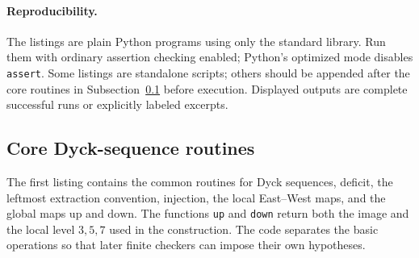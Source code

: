 \documentclass[11pt]{article}
\theoremstyle{plain}
\theoremstyle{definition}
\theoremstyle{remark}
\begin{document}
\paragraph{Reproducibility.}
The listings are plain Python programs using only the standard library.  Run
them with ordinary assertion checking enabled; Python's optimized mode disables
\lstinline{assert}.  Some listings are standalone scripts; others should be
appended after the core routines in
Subsection~\ref{subsec:core-code} before execution.
Displayed outputs are complete successful runs or explicitly labeled excerpts.
\subsection{Core Dyck-sequence routines}
\label{subsec:core-code}
The first listing contains the common routines for Dyck sequences, deficit, the
leftmost extraction convention, injection, the local East--West maps, and the
global maps \(\mathrm{up}\) and \(\mathrm{down}\).  The functions
\lstinline{up} and \lstinline{down} return both the image and the local level
\(3,5,7\) used in the construction.  The code separates the basic operations
so that later finite checkers can impose their own hypotheses.
\end{document}
